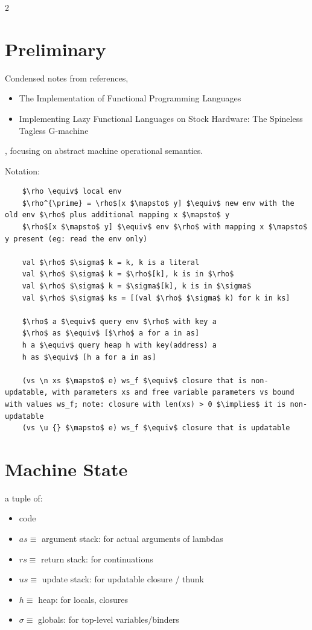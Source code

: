 \documentclass[8pt]{extarticle}
\begin{document}
  
\begin{multicols*}{2}

  \section{Preliminary}

  Condensed notes from references,
  \begin{itemize}
  \item The Implementation of Functional Programming Languages \cite{peyton1987}
  \item Implementing Lazy Functional Languages on Stock Hardware: The Spineless Tagless G-machine \cite{peyton1992}
  \end{itemize}
  , focusing on abstract machine operational semantics.

  Notation:

  \begin{lstlisting}
    $\rho \equiv$ local env
    $\rho^{\prime} = \rho$[x $\mapsto$ y] $\equiv$ new env with the old env $\rho$ plus additional mapping x $\mapsto$ y
    $\rho$[x $\mapsto$ y] $\equiv$ env $\rho$ with mapping x $\mapsto$ y present (eg: read the env only)

    val $\rho$ $\sigma$ k = k, k is a literal
    val $\rho$ $\sigma$ k = $\rho$[k], k is in $\rho$
    val $\rho$ $\sigma$ k = $\sigma$[k], k is in $\sigma$
    val $\rho$ $\sigma$ ks = [(val $\rho$ $\sigma$ k) for k in ks]

    $\rho$ a $\equiv$ query env $\rho$ with key a
    $\rho$ as $\equiv$ [$\rho$ a for a in as]
    h a $\equiv$ query heap h with key(address) a
    h as $\equiv$ [h a for a in as]

    (vs \n xs $\mapsto$ e) ws_f $\equiv$ closure that is non-updatable, with parameters xs and free variable parameters vs bound with values ws_f; note: closure with len(xs) > 0 $\implies$ it is non-updatable
    (vs \u {} $\mapsto$ e) ws_f $\equiv$ closure that is updatable
  \end{lstlisting}
  
  \section{Machine State}

  a tuple of:

  \begin{itemize}
  \item code
  \item $as \equiv$ argument stack: for actual arguments of lambdas
  \item $rs \equiv$ return stack: for continuations
  \item $us \equiv$ update stack: for updatable closure / thunk
  \item $h \equiv$ heap: for locals, closures
  \item $\sigma \equiv$ globals: for top-level variables/binders
  \end{itemize}


\end{multicols*}
\end{document}
